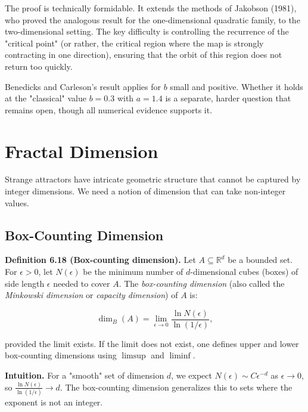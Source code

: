 The proof is technically formidable. It extends the methods of Jakobson (1981), who proved the analogous result for the one-dimensional quadratic family, to the two-dimensional setting. The key difficulty is controlling the recurrence of the "critical point" (or rather, the critical region where the map is strongly contracting in one direction), ensuring that the orbit of this region does not return too quickly.

\begin{remark}
Benedicks and Carleson's result applies for $b$ small and positive. Whether it holds at the "classical" value $b = 0.3$ with $a = 1.4$ is a separate, harder question that remains open, though all numerical evidence supports it.


\bigskip

\end{remark}


\section{Fractal Dimension}\label{sec:6.5}

Strange attractors have intricate geometric structure that cannot be captured by integer dimensions. We need a notion of dimension that can take non-integer values.

\subsection{Box-Counting Dimension}\label{sec:6.5.1}

\textbf{Definition 6.18 (Box-counting dimension).} Let $A \subseteq \mathbb{R}^d$ be a bounded set. For $\epsilon > 0$, let $N(\epsilon)$ be the minimum number of $d$-dimensional cubes (boxes) of side length $\epsilon$ needed to cover $A$. The \textit{box-counting dimension} (also called the \textit{Minkowski dimension} or \textit{capacity dimension}) of $A$ is:

\[
\dim_B(A) = \lim_{\epsilon \to 0} \frac{\ln N(\epsilon)}{\ln(1/\epsilon)},
\]

provided the limit exists. If the limit does not exist, one defines upper and lower box-counting dimensions using $\limsup$ and $\liminf$.

\textbf{Intuition.} For a "smooth" set of dimension $d$, we expect $N(\epsilon) \sim C \epsilon^{-d}$ as $\epsilon \to 0$, so $\frac{\ln N(\epsilon)}{\ln(1/\epsilon)} \to d$. The box-counting dimension generalizes this to sets where the exponent is not an integer.

